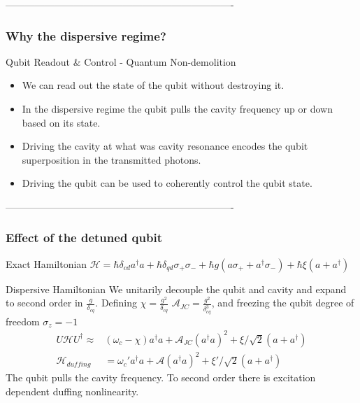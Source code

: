 \documentclass{beamer}
\begin{document}
----------------------------------------------------------------------
\begin{frame}
    \frametitle{Why the dispersive regime?}
    \begin{block}{Qubit Readout \& Control - Quantum Non-demolition}
        \begin{itemize}
            \item We can read out the state of the qubit 
                    without destroying it. 
            \item In the dispersive regime the qubit pulls the 
                    cavity frequency up or down based on its state.
            \item Driving the cavity at what was cavity 
                    resonance encodes the qubit superposition 
                    in the transmitted photons. 
            \item Driving the qubit can be used to coherently 
                    control the qubit state. 
        \end{itemize}
    \end{block}
\end{frame}
----------------------------------------------------------------------
\begin{frame}
    \frametitle{Effect of the detuned qubit}
    \begin{block}{Exact Hamiltonian}
        $
        \mathscr{H} = \hbar \delta_{cd} a^\dagger a + 
        \hbar \delta_{qd}\sigma_+ \sigma_- + 
        \hbar g ( a \sigma_+ + a^\dagger \sigma_- ) 
        +\hbar \xi (a+a^\dagger)
        $
    \end{block}
    \begin{block}{Dispersive Hamiltonian}
    We unitarily decouple the qubit and cavity 
    and expand to second order in $\frac{g}{\delta_{cq}}$. Defining 
    $\chi = \frac{g^2}{\delta_{cq}}$
    $\mathscr{A}_{JC} = \frac{g^2}{\delta_{cq}^3}$, 
    and freezing the qubit degree of freedom 
    $\sigma_z = -1$
    \begin{align}
    U\mathscr{H}U ^ \dagger \approx& 
         \left(\omega_c - \chi\right) a ^ \dagger a
        + \mathscr{A}_{JC}\left(a^\dagger a\right)^2
        + \xi/\sqrt{2} ( a + a^\dagger ) \\
    \mathscr{H}_{duffing} &= \omega_c' a^\dagger a 
        + \mathscr{A} \left(a^\dagger a\right)^2 
        + \xi'/\sqrt{2}\left(a+a^\dagger\right)
    \end{align} 
    The qubit pulls the cavity frequency. 
    To second order there is excitation dependent 
    duffing nonlinearity.
    \end{block}
\end{frame}
\end{document}
